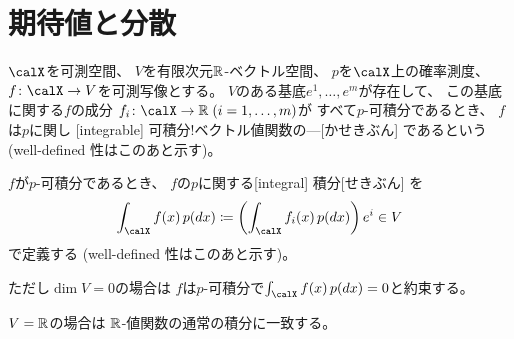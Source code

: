 \documentclass[report]{jlreq}
\begin{document}
%
\section{期待値と分散}

\begin{definition}[ベクトル値関数の積分]
    $\calX$を可測空間、
    $V$を有限次元$\mathbb{R}$-ベクトル空間、
    $p$を$\calX$上の確率測度、
    $f \colon \calX \to V$を可測写像とする。
    $V$のある基底$e^1, \dots, e^m$が存在して、
    この基底に関する$f$の成分
    $f_i \colon \calX \to \R \; (i = 1, \dots, m)$が
    すべて$p$-可積分であるとき、
    $f$は$p$に関し
    [integrable]
        {可積分!ベクトル値関数の---}[かせきぶん]
    であるという
    (well-defined 性はこのあと示す)。

    $f$が$p$-可積分であるとき、
    $f$の$p$に関する[integral]
        {積分}[せきぶん]
    を
    \begin{equation}
        \int_\calX f(x) \, p(dx)
            \coloneqq \myparen{
                \int_\calX f_i(x) \, p(dx)
            } e^i
            \in V
    \end{equation}
    で定義する
    (well-defined 性はこのあと示す)。

    ただし$\dim V = 0$の場合は
    $f$は$p$-可積分で$\int_\calX f(x) \, p(dx) = 0$と約束する。
\end{definition}

\begin{remark}
    $V = \mathbb{R}$の場合は
    $\mathbb{R}$-値関数の通常の積分に一致する。
\end{remark}
\end{document}
